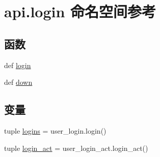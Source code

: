 \hypertarget{namespaceapi_1_1login}{\section{api.\-login 命名空间参考}
\label{namespaceapi_1_1login}
}
\subsection*{函数}
\begin{DoxyCompactItemize}
\item 
def \hyperlink{namespaceapi_1_1login_ac78210be6692d456bd73a28ff3f70892}{login}
\item 
def \hyperlink{namespaceapi_1_1login_a95e1a4f41fc242a03b1c5e72ca4f5104}{down}
\end{DoxyCompactItemize}
\subsection*{变量}
\begin{DoxyCompactItemize}
\item 
tuple \hyperlink{namespaceapi_1_1login_a285c09905a1027ad1c586bdd2184e860}{logins} = user\-\_\-login.\-login()
\item 
tuple \hyperlink{namespaceapi_1_1login_a9c96b35f70f6582337b5eb19ec58eeab}{login\-\_\-act} = user\-\_\-login\-\_\-act.\-login\-\_\-act()
\end{DoxyCompactItemize}


